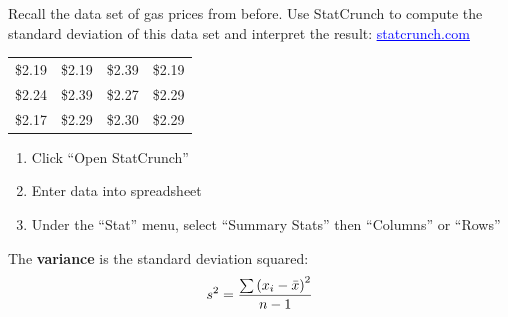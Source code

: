\documentclass[../mathNotesPreamble]{subfiles}
\begin{document}
  \begin{ex*}
    Recall the data set of gas prices from before. Use StatCrunch to compute the standard deviation of this data set and interpret the result:
    \href{https://www.statcrunch.com/}{\textcolor{blue}{\underline{statcrunch.com}}}
    
  \end{ex*}
  \begin{center}
    \begin{tabular}{@{}*{4}{c}@{}}\toprule
      \$2.19 & \$2.19 & \$2.39 & \$2.19 \\
      \$2.24 & \$2.39 & \$2.27 & \$2.29 \\
      \$2.17 & \$2.29 & \$2.30 & \$2.29 \\\bottomrule
    \end{tabular}
  \end{center}
  \begin{enumerate}
    \item Click ``Open StatCrunch''
    \item Enter data into spreadsheet
    \item Under the ``Stat'' menu, select ``Summary Stats'' then ``Columns'' or ``Rows''
  \end{enumerate}
  \begin{defn*}
    The \textbf{variance} is the standard deviation squared:
      \[s^2=\frac{\sum {\left(x_i-\bar{x}\right)}^2}{n-1}\]
    \vspace*{-\baselineskip}
  \end{defn*}

  \pagebreak
\end{document}
